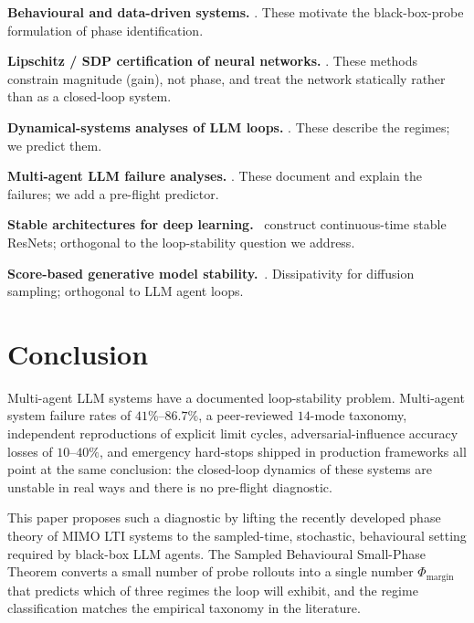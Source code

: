 \documentclass[11pt,a4paper]{article}
\theoremstyle{definition}
\theoremstyle{remark}
\newcommand{\PhaseMargin}{\Phi_{\mathrm{margin}}}
\begin{document}
\textbf{Behavioural and data-driven systems.} \citet{Willems1986Behavioural,Willems2007Behavioural,Willems2005FundamentalLemma,Coulson2019DeePC}.  These motivate the
black-box-probe formulation of phase identification.

\textbf{Lipschitz / SDP certification of neural networks.}
\citep{Fazlyab2019Lipschitz,Hashemi2024LipShiFT,Yang2024LipNeXt}.  These
methods constrain magnitude (gain), not phase, and treat the network
statically rather than as a closed-loop system.

\textbf{Dynamical-systems analyses of LLM loops.}
\citep{Tacheny2025AgenticLoops,Wang2025AttractorCycles}.  These describe the
regimes; we predict them.

\textbf{Multi-agent LLM failure analyses.}
\citep{Cemri2025MAST,Oh2025BeliefEntrenchment,Sci2026PersuasionFailure,Wynn2025TalkCheap,DuMultiAgentDebate2024,ICLRBlog2025MAD}.
These document and explain the failures; we add a pre-flight predictor.

\textbf{Stable architectures for deep
learning.}~\citep{Haber2017StableArch} construct continuous-time stable
ResNets; orthogonal to the loop-stability question we address.

\textbf{Score-based generative model
stability.}~\citep{ChenSampling2023,Forgetting2026}.  Dissipativity for
diffusion sampling; orthogonal to LLM agent loops.

\section{Conclusion}\label{sec:conclusion}

Multi-agent LLM systems have a documented loop-stability problem.
Multi-agent system failure rates of $41\%$--$86.7\%$, a peer-reviewed
$14$-mode taxonomy, independent reproductions of explicit limit cycles,
adversarial-influence accuracy losses of $10$--$40\%$, and emergency
hard-stops shipped in production frameworks all point at the same
conclusion: the closed-loop dynamics of these systems are unstable in
real ways and there is no pre-flight diagnostic.

This paper proposes such a diagnostic by lifting the recently developed
phase theory of MIMO LTI systems to the sampled-time, stochastic,
behavioural setting required by black-box LLM agents.  The Sampled
Behavioural Small-Phase Theorem converts a small number of probe
rollouts into a single number $\PhaseMargin$ that predicts which of
three regimes the loop will exhibit, and the regime classification
matches the empirical taxonomy in the literature.
\end{document}
